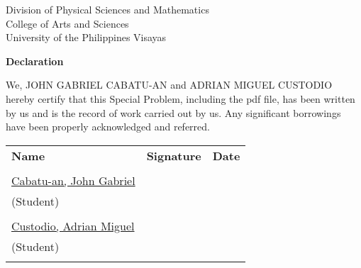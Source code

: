 \thispagestyle{empty}
\begin{center}
	Division of Physical Sciences and Mathematics\\
	College of Arts and Sciences\\
	University of the Philippines Visayas 
	
	\textbf{Declaration}
\end{center}

We, JOHN GABRIEL CABATU-AN and ADRIAN MIGUEL CUSTODIO hereby certify that this Special Problem, including the pdf file, has been written by us and is the record of work carried out by us. Any significant borrowings have been properly acknowledged and referred.

\begin{tabular}{lll}
	\bfseries Name  & \bfseries Signature & \bfseries Date\\ \\
	\underline{Cabatu-an, John Gabriel} &\signaturerule  & \signaturerule\\ 
	(Student)\\ \\
	\underline{Custodio, Adrian Miguel} &\signaturerule &\signaturerule\\
	(Student)\\ \\

\end{tabular}
